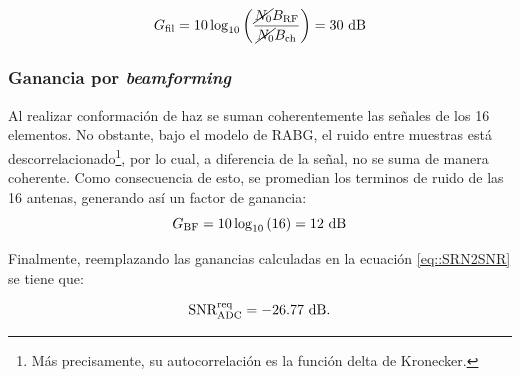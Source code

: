 \documentclass[../../main.tex]{subfiles}
\begin{document}
\[G_\textrm{fil} = 10 \log_{10}\left(\frac{\cancel{N_0} B_\textrm{RF}}{\cancel{N_0} B_\textrm{ch}}\right) = 30~\textrm{dB}\]

\subsubsection{Ganancia por \textit{beamforming}}
Al realizar conformación de haz se suman coherentemente las señales de los 16 elementos. No obstante, bajo el modelo de RABG, el ruido entre muestras está descorrelacionado\footnote{Más precisamente, su autocorrelación es la función delta de Kronecker.}, por lo cual, a diferencia de la señal, no se suma de manera coherente.
Como consecuencia de esto, se promedian los terminos de ruido de las 16 antenas, generando así un factor de ganancia:
\[G_\textrm{BF} = 10 \log_{10}{(16)} = 12~\textrm{dB}\]

Finalmente, reemplazando las ganancias calculadas en la ecuación \ref{eq::SRN2SNR} se tiene que:

\begin{equation}
    \textrm{SNR}^\textrm{req}_\textrm{ADC} = -26.77~\textrm{dB}.
    \label{eq::SNRreqADC}
\end{equation}
\end{document}
